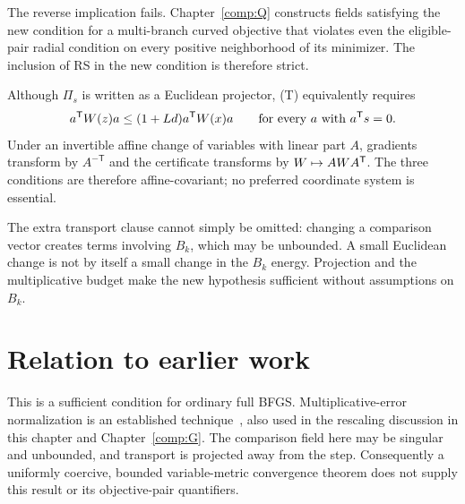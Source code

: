 The reverse implication fails. Chapter~\ref{comp:Q} constructs fields satisfying the new condition for a multi-branch curved objective that violates even the eligible-pair radial condition on every positive neighborhood of its minimizer. The inclusion of RS in the new condition is therefore strict.

Although $\Pi_s$ is written as a Euclidean projector, (T) equivalently requires
\[
 a^{\mathsf T} W(z)a\le(1+Ld)a^{\mathsf T} W(x)a\qquad\text{for every }a\text{ with }a^{\mathsf T} s=0.
\]
Under an invertible affine change of variables with linear part $A$, gradients transform by $A^{-\mathsf T}$ and the certificate transforms by $W\mapsto AWA^{\mathsf T}$. The three conditions are therefore affine-covariant; no preferred coordinate system is essential.

The extra transport clause cannot simply be omitted: changing a comparison vector creates terms involving $B_k$, which may be unbounded. A small Euclidean change is not by itself a small change in the $B_k$ energy. Projection and the multiplicative budget make the new hypothesis sufficient without assumptions on $B_k$.


\endgroup


\section*{Relation to earlier work}
This is a sufficient condition for ordinary full BFGS. Multiplicative-error normalization is an established technique~\cite[Lemmas 2.2--2.3]{FND_CV13}, also used in the rescaling discussion in this chapter and Chapter~\ref{comp:G}. The comparison field here may be singular and unbounded, and transport is projected away from the step. Consequently a uniformly coercive, bounded variable-metric convergence theorem does not supply this result or its objective-pair quantifiers.

